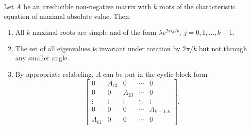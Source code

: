 Let $A$ be an irreducible non-negative matrix with $k$ roots of the characteristic equation of maximal absolute value. Then:
\begin{enumerate}
\item All $k$ maximal roots are simple and of the form $\lambda e^{2\pi i j/k}$, $j = 0, 1, \ldots, k-1$.
\item The set of all eigenvalues is invariant under rotation by $2\pi/k$ but not through any smaller angle.
\item By appropriate relabeling, $A$ can be put in the cyclic block form
$$\begin{bmatrix}
0 & A_{12} & 0 & \cdots & 0 \\
0 & 0 & A_{23} & \cdots & 0 \\
\vdots & \vdots & \vdots & \ddots & \vdots \\
0 & 0 & 0 & \cdots & A_{k-1,k} \\
A_{k1} & 0 & 0 & \cdots & 0
\end{bmatrix}.$$
\end{enumerate}
